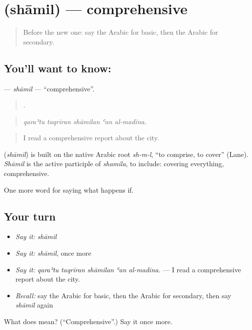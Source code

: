 \section[\texorpdfstring{\ar{شامل} (shāmil)}{شامل (shāmil)}]{ (shāmil) — comprehensive}

\label{lesson:AR-C419-shamil}



\begin{quote}
Before the new one: say the Arabic for basic, then the Arabic for secondary.
\end{quote}

\subsection*{You'll want to know: }
\textbf{} — \emph{shāmil} — \textquotedblleft{}comprehensive\textquotedblright{}.

\begin{quote}
    .
\end{quote}

\begin{quote}
\emph{qaraʾtu taqrīran shāmilan ʿan al-madīna.}
\end{quote}

\begin{quote}
I read a comprehensive report about the city.
\end{quote}

\begin{cousinweb}
\textbf{} (\emph{shāmil}) is built on the native Arabic root \emph{sh-m-l}, \textquotedblleft{}to comprise, to cover\textquotedblright{} (Lane). \emph{Shāmil} is the active participle of \emph{shamila}, to include: covering everything, comprehensive.
\end{cousinweb}

\begin{grammarlens}[title={What you've built}]
One more word for saying what happens if.
\end{grammarlens}

\subsection*{Your turn}
\begin{itemize}
\raggedright
  \item \emph{Say it:} \emph{shāmil}
  \item \emph{Say it:} \emph{shāmil}, once more
  \item \emph{Say it:} \emph{qaraʾtu taqrīran shāmilan ʿan al-madīna.} — I read a comprehensive report about the city.
  \item \emph{Recall:} say the Arabic for basic, then the Arabic for secondary, then say \emph{shāmil} again
\end{itemize}

\begin{tcolorbox}[breakable,colback=teal!4,colframe=teal!35!black,title={Before you move on}]
What does  mean? (\textquotedblleft{}Comprehensive\textquotedblright{}.) Say it once more.
\end{tcolorbox}
